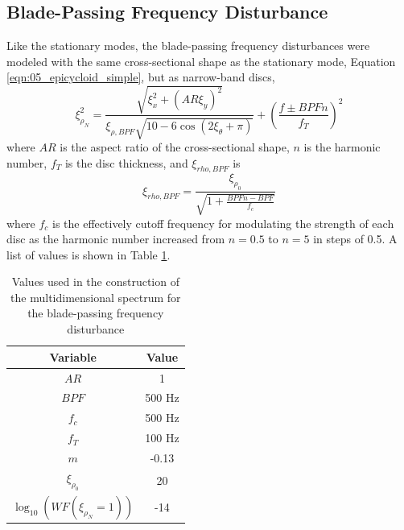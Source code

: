 \subsection{Blade-Passing Frequency Disturbance}
Like the stationary modes, the blade-passing frequency disturbances were modeled with the same cross-sectional shape as the stationary mode, Equation \ref{eqn:05_epicycloid_simple}, but as narrow-band discs,
\begin{equation}
  \xi_{\rho_N}^2 = \frac{\sqrt{\xi_x^2+(AR\xi_y)^2}}{\xi_{\rho,BPF}\sqrt{10-6\cos(2\xi_\theta+\pi)}}+\left(\frac{f\pm BPF n}{f_T}\right)^2
  \label{eqn:05_blade_passing_frequency}
\end{equation}
where $AR$ is the aspect ratio of the cross-sectional shape, $n$ is the harmonic number, $f_T$ is the disc thickness, and $\xi_{rho,BPF}$ is
\begin{equation}
  \xi_{rho,BPF} = \frac{\xi_{\rho_0}}{\sqrt{1+\frac{BPF n-BPF}{f_c}}}
\end{equation}
where $f_c$ is the effectively cutoff frequency for modulating the strength of each disc as the harmonic number increased from $n=0.5$ to $n=5$ in steps of 0.5.
A list of values is shown in Table \ref{tab:05_bpf}.
\begin{table}
  \centering
  \caption{Values used in the construction of the multidimensional spectrum for the blade-passing frequency disturbance}
  \begin{tabular}{c c}
    Variable & Value \\
    \hline \hline
    $AR$ & 1 \\
    $BPF$ & 500 Hz \\
    $f_c$ & 500 Hz \\
    $f_T$ & 100 Hz \\
    $m$ & -0.13 \\
    $\xi_{\rho_0}$ & 20 \\
    $\log_{10}(WF(\xi_{\rho_N}=1))$ & -14
  \end{tabular}
  \label{tab:05_bpf}
\end{table}


